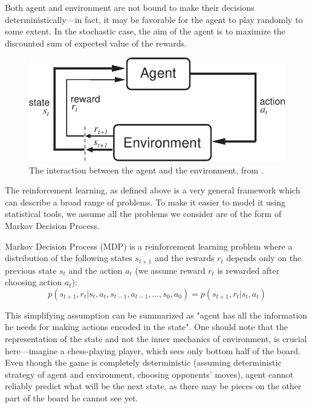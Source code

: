 Both agent and environment are not bound to make their decisions deterministically---in fact, it may be favorable for the agent to play randomly to some extent. In the stochastic case, the aim of the agent is to maximize the discounted sum of expected value of the rewards.

\begin{figure}[!h]
  \center
  \includegraphics[scale=0.8]{images/Agent-Env-crop.pdf}
  \caption{The interaction between the agent and the environment, from \cite{reinforcement-book}.}
\end{figure}

The reinforcement learning, as defined above is a very general framework which can describe a broad range of problems. To make it easier to model it using statistical tools, we assume all the problems we consider are of the form of Markov Decision Process.

Markov Decision Process (MDP) is a reinforcement learning problem where a distribution of the following states $s_{t+1}$ and the rewards $r_t$ depends only on the previous state $s_t$ and the action $a_t$ (we assume reward $r_t$ is rewarded after choosing action $a_t$):
\begin{equation} \label{mdp}
  p(s_{t+1}, r_t|s_t, a_t, s_{t-1}, a_{t-1}, \ldots, s_0, a_0) = p(s_{t+1}, r_t|s_t, a_t)
\end{equation}

This simplifying assumption can be summarized as "agent has all the information he needs for making actions encoded in the state". One should note that the representation of the state and not the inner mechanics of environment, is crucial here---imagine a chess-playing player, which sees only bottom half of the board. Even though the game is completely deterministic (assuming deterministic strategy of agent and environment, choosing opponents' moves), agent cannot reliably predict what will be the next state, as there may be pieces on the other part of the board he cannot see yet.

